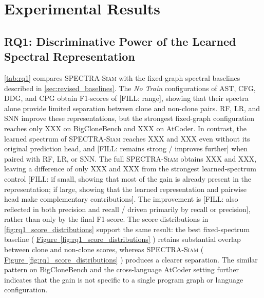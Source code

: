 \documentclass[final,5p,times,twocolumn]{elsarticle}
\newcommand{\method}{\textsc{SPECTRA-Siam}}
\theoremstyle{plain}
\newcommand{\subfigref}[2]{%
    \hyperref[#2]{Figure~\ref*{#1}\subref*{#2}}%
}
\begin{document}
\section{Experimental Results}
\label{sec:exp_results}

\subsection{RQ1: Discriminative Power of the Learned Spectral Representation}
\label{sec:rq1}
\autoref{tab:rq1} compares \method{} with the fixed-graph spectral baselines described in \autoref{sec:revised_baselines}. The \emph{No Train} configurations of AST, CFG, DDG, and CPG obtain F1-scores of [FILL: range], showing that their spectra alone provide limited separation between clone and non-clone pairs. RF, LR, and SNN improve these representations, but the strongest fixed-graph configuration reaches only XXX on BigCloneBench and XXX on AtCoder. In contrast, the learned spectrum of \method{} reaches XXX and XXX even without its original prediction head, and [FILL: remains strong / improves further] when paired with RF, LR, or SNN. The full \method{} obtains XXX and XXX, leaving a difference of only XXX and XXX from the strongest learned-spectrum control [FILL: if small, showing that most of the gain is already present in the representation; if large, showing that the learned representation and pairwise head make complementary contributions]. The improvement is [FILL: also reflected in both precision and recall / driven primarily by recall or precision], rather than only by the final F1-score. The score distributions in \autoref{fig:rq1_score_distributions} support the same result: the best fixed-spectrum baseline (\subfigref{fig:rq1_score_distributions}{fig:rq1_best_spectral}) retains substantial overlap between clone and non-clone scores, whereas \method{} (\subfigref{fig:rq1_score_distributions}{fig:rq1_method}) produces a clearer separation. The similar pattern on BigCloneBench and the cross-language AtCoder setting further indicates that the gain is not specific to a single program graph or language configuration.
\end{document}
